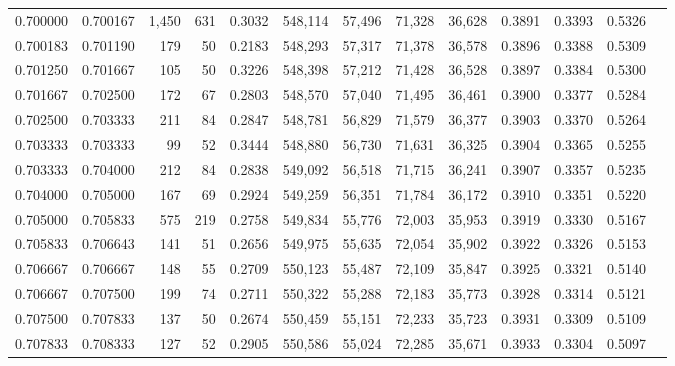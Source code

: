 \begin{tabular}{rrrrrrrrrrrrr}
0.700000 & 0.700167 & 1,450 & 631 &                                     0.3032 & 548,114 &  57,496 &  71,328 &  36,628 & 0.3891 & 0.3393 & 0.5326 \\
0.700183 & 0.701190 &   179 &  50 &                                     0.2183 & 548,293 &  57,317 &  71,378 &  36,578 & 0.3896 & 0.3388 & 0.5309 \\
0.701250 & 0.701667 &   105 &  50 &                                     0.3226 & 548,398 &  57,212 &  71,428 &  36,528 & 0.3897 & 0.3384 & 0.5300 \\
0.701667 & 0.702500 &   172 &  67 &                                     0.2803 & 548,570 &  57,040 &  71,495 &  36,461 & 0.3900 & 0.3377 & 0.5284 \\
0.702500 & 0.703333 &   211 &  84 &                                     0.2847 & 548,781 &  56,829 &  71,579 &  36,377 & 0.3903 & 0.3370 & 0.5264 \\
0.703333 & 0.703333 &    99 &  52 &                                     0.3444 & 548,880 &  56,730 &  71,631 &  36,325 & 0.3904 & 0.3365 & 0.5255 \\
0.703333 & 0.704000 &   212 &  84 &                                     0.2838 & 549,092 &  56,518 &  71,715 &  36,241 & 0.3907 & 0.3357 & 0.5235 \\
0.704000 & 0.705000 &   167 &  69 &                                     0.2924 & 549,259 &  56,351 &  71,784 &  36,172 & 0.3910 & 0.3351 & 0.5220 \\
0.705000 & 0.705833 &   575 & 219 &                                     0.2758 & 549,834 &  55,776 &  72,003 &  35,953 & 0.3919 & 0.3330 & 0.5167 \\
0.705833 & 0.706643 &   141 &  51 &                                     0.2656 & 549,975 &  55,635 &  72,054 &  35,902 & 0.3922 & 0.3326 & 0.5153 \\
0.706667 & 0.706667 &   148 &  55 &                                     0.2709 & 550,123 &  55,487 &  72,109 &  35,847 & 0.3925 & 0.3321 & 0.5140 \\
0.706667 & 0.707500 &   199 &  74 &                                     0.2711 & 550,322 &  55,288 &  72,183 &  35,773 & 0.3928 & 0.3314 & 0.5121 \\
0.707500 & 0.707833 &   137 &  50 &                                     0.2674 & 550,459 &  55,151 &  72,233 &  35,723 & 0.3931 & 0.3309 & 0.5109 \\
0.707833 & 0.708333 &   127 &  52 &                                     0.2905 & 550,586 &  55,024 &  72,285 &  35,671 & 0.3933 & 0.3304 & 0.5097 \\

\end{tabular}
